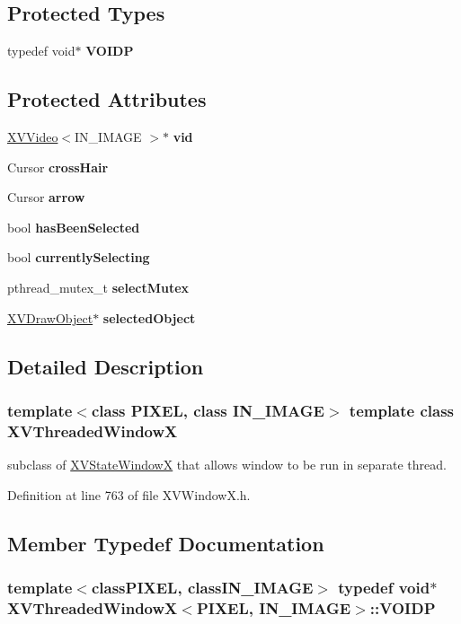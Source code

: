 \subsection*{Protected Types}
\begin{CompactItemize}
\item 
typedef void$\ast$ {\bf VOIDP}
\end{CompactItemize}
\subsection*{Protected Attributes}
\begin{CompactItemize}
\item 
\hyperlink{class_XVVideo}{XVVideo}$<$IN\_\-IMAGE $>$$\ast$ {\bf vid}
\item 
Cursor {\bf cross\-Hair}
\item 
Cursor {\bf arrow}
\item 
bool {\bf has\-Been\-Selected}
\item 
bool {\bf currently\-Selecting}
\item 
pthread\_\-mutex\_\-t {\bf select\-Mutex}
\item 
\hyperlink{class_XVDrawObject}{XVDraw\-Object}$\ast$ {\bf selected\-Object}
\end{CompactItemize}


\subsection{Detailed Description}
\subsubsection*{template$<$class PIXEL, class IN\_\-IMAGE$>$  template class XVThreaded\-Window\-X}

subclass of \hyperlink{class_XVStateWindowX}{XVState\-Window\-X} that allows window to be run in separate thread.





Definition at line 763 of file XVWindow\-X.h.

\subsection{Member Typedef Documentation}
\label{XVThreadedWindowX_t0}
\hypertarget{class_XVThreadedWindowX_t0}{
\subsubsection[VOIDP]{\setlength{\rightskip}{0pt plus 5cm}template$<$classPIXEL, classIN\_\-IMAGE$>$ typedef void$\ast$ XVThreaded\-Window\-X$<$PIXEL, IN\_\-IMAGE$>$::VOIDP}}




